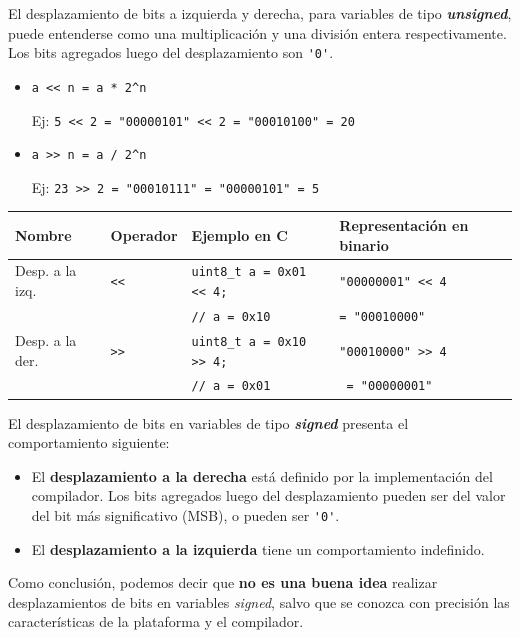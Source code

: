 \documentclass[paper=a4, fontsize=11pt]{scrartcl}	%
\numberwithin{equation}{section} %
\numberwithin{figure}{section} %
\numberwithin{table}{section} %
\begin{document}
El desplazamiento de bits a izquierda y derecha, para variables de tipo
\textbf{\emph{unsigned}}, puede entenderse como una multiplicación y una división entera
respectivamente. Los bits agregados luego del desplazamiento son
\verb!'0'!.

\begin{itemize}
  \item \verb!a << n = a * 2^n!

    Ej: \verb!5 << 2 = "00000101" << 2 = "00010100" = 20!

  \item \verb!a >> n = a / 2^n!

    Ej: \verb!23 >> 2 = "00010111" = "00000101" = 5!
\end{itemize}

\begin{table}[h]
  \centering
  \small
  \begin{tabular}{l | l | l | l}
    \hline
    \textbf{Nombre} & \textbf{Operador} & \textbf{Ejemplo en C} & \textbf{Representación en binario} \\ \hline
    Desp. a la izq. & \verb!<<! & \verb!uint8_t a = 0x01 << 4;! & \verb!"00000001" << 4! \\
    & & \verb!// a = 0x10! &\verb!= "00010000"! \\ \hline
    Desp. a la der. & \verb!>>! & \verb!uint8_t a = 0x10 >> 4;!  & \verb!"00010000" >> 4!\\
    & & \verb!// a = 0x01! &  \verb! = "00000001"! \\ \hline
  \end{tabular}
\end{table}

El desplazamiento de bits en variables de tipo \textbf{\emph{signed}} presenta el
comportamiento siguiente:
\begin{itemize}
  \item El \textbf{desplazamiento a la derecha} está definido por la
    implementación del compilador. Los bits agregados luego del
    desplazamiento pueden ser del valor del
    bit más significativo (MSB), o pueden ser \verb!'0'!.
  \item El \textbf{desplazamiento a la izquierda} {\color{red}tiene un
    comportamiento indefinido}.
\end{itemize}

Como conclusión, podemos decir que \textbf{no es una buena idea}
realizar desplazamientos de bits en variables \emph{signed}, salvo que
se conozca con precisión las características de la plataforma y el
compilador.
\end{document}
